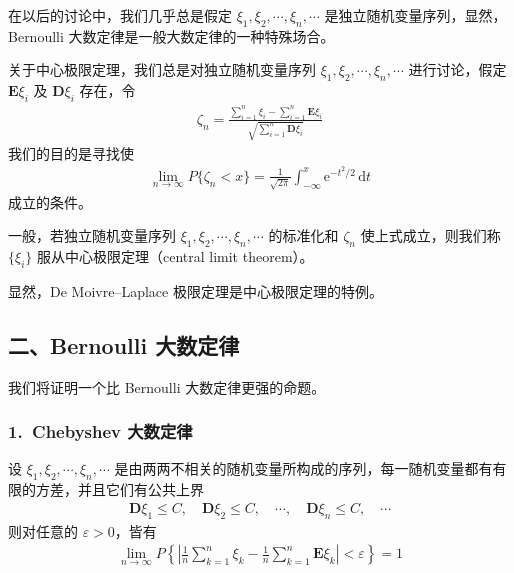 \documentclass[../../main.tex]{subfiles}
\begin{document}
在以后的讨论中，我们几乎总是假定 $\xi_1,\xi_2,\cdots,\xi_n,\cdots$ 是独立随机变量序列，显然，Bernoulli 大数定律是一般大数定律的一种特殊场合。

关于中心极限定理，我们总是对独立随机变量序列 $\xi_1,\xi_2,\cdots,\xi_n,\cdots$ 进行讨论，假定 $\boldsymbol{E}\xi_i$ 及 $\boldsymbol{D}\xi_i$ 存在，令
\begin{align}
\zeta_n=\frac{\sum_{i=1}^{n}\xi_i-\sum_{i=1}^{n}\boldsymbol{E}\xi_i}{\sqrt{\sum_{i=1}^{n}\boldsymbol{D}\xi_i}}\label{align:ch05-标准化和}
\end{align}
我们的目的是寻找使
\begin{align}
\lim_{n\to\infty}P\{\zeta_n<x\}=\frac{1}{\sqrt{2\pi}}\int_{-\infty}^{x}\mathrm{e}^{-t^{2}/2}\,\mathrm{d}t
\end{align}
成立的条件。

一般，若独立随机变量序列 $\xi_1,\xi_2,\cdots,\xi_n,\cdots$ 的标准化和 $\zeta_n$ 使上式成立，则我们称 $\{\xi_i\}$ 服从中心极限定理（central limit theorem）。

显然，De Moivre--Laplace 极限定理是中心极限定理的特例。

\subsection*{二、Bernoulli 大数定律}

我们将证明一个比 Bernoulli 大数定律更强的命题。

\subsubsection*{1.\ Chebyshev 大数定律}

\begin{theorem}\label{theorem:ch05-Chebyshev大数定律}
设 $\xi_1,\xi_2,\cdots,\xi_n,\cdots$ 是由两两不相关的随机变量所构成的序列，每一随机变量都有有限的方差，并且它们有公共上界
\begin{align*}
\boldsymbol{D}\xi_1\leqslant C,\quad \boldsymbol{D}\xi_2\leqslant C,\quad\cdots,\quad \boldsymbol{D}\xi_n\leqslant C,\quad\cdots
\end{align*}
则对任意的 $\varepsilon>0$，皆有
\begin{align}
\lim_{n\to\infty}P\!\left\{\left|\frac1n\sum_{k=1}^{n}\xi_k-\frac1n\sum_{k=1}^{n}\boldsymbol{E}\xi_k\right|<\varepsilon\right\}=1\label{align:ch05-Chebyshev大数定律结论}
\end{align}
\end{theorem}
\end{document}
